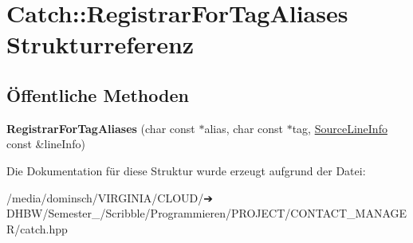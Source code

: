 \hypertarget{structCatch_1_1RegistrarForTagAliases}{}\section{Catch\+:\+:Registrar\+For\+Tag\+Aliases Strukturreferenz}
\label{structCatch_1_1RegistrarForTagAliases}
\subsection*{Öffentliche Methoden}
\begin{DoxyCompactItemize}
\item 
\mbox{\label{structCatch_1_1RegistrarForTagAliases_ae4e45830e4763bcd65d55d8db9167b69}} 
{\bfseries Registrar\+For\+Tag\+Aliases} (char const $\ast$alias, char const $\ast$tag, \hyperlink{structCatch_1_1SourceLineInfo}{Source\+Line\+Info} const \&line\+Info)
\end{DoxyCompactItemize}


Die Dokumentation für diese Struktur wurde erzeugt aufgrund der Datei\+:\begin{DoxyCompactItemize}
\item 
/media/dominsch/\+V\+I\+R\+G\+I\+N\+I\+A/\+C\+L\+O\+U\+D/➔ D\+H\+B\+W/\+Semester\+\_/\+Scribble/\+Programmieren/\+P\+R\+O\+J\+E\+C\+T/\+C\+O\+N\+T\+A\+C\+T\+\_\+\+M\+A\+N\+A\+G\+E\+R/catch.\+hpp\end{DoxyCompactItemize}
